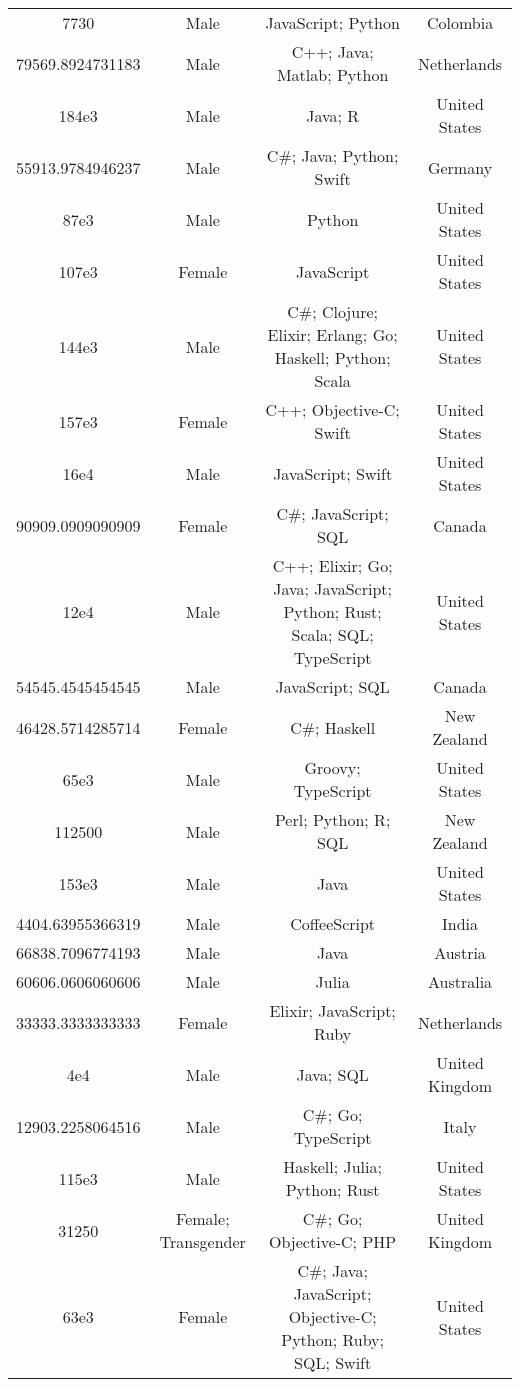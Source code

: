 \begin{center}
\begin{tabular}{ |c|c|c|c| }
7730  &  Male  &  JavaScript; Python  &  Colombia  \\ 
79569.8924731183  &  Male  &  C++; Java; Matlab; Python  &  Netherlands  \\ 
184e3  &  Male  &  Java; R  &  United States  \\ 
55913.9784946237  &  Male  &  C\#; Java; Python; Swift  &  Germany  \\ 
87e3  &  Male  &  Python  &  United States  \\ 
107e3  &  Female  &  JavaScript  &  United States  \\ 
144e3  &  Male  &  C\#; Clojure; Elixir; Erlang; Go; Haskell; Python; Scala  &  United States  \\ 
157e3  &  Female  &  C++; Objective-C; Swift  &  United States  \\ 
16e4  &  Male  &  JavaScript; Swift  &  United States  \\ 
90909.0909090909  &  Female  &  C\#; JavaScript; SQL  &  Canada  \\ 
12e4  &  Male  &  C++; Elixir; Go; Java; JavaScript; Python; Rust; Scala; SQL; TypeScript  &  United States  \\ 
54545.4545454545  &  Male  &  JavaScript; SQL  &  Canada  \\ 
46428.5714285714  &  Female  &  C\#; Haskell  &  New Zealand  \\ 
65e3  &  Male  &  Groovy; TypeScript  &  United States  \\ 
112500  &  Male  &  Perl; Python; R; SQL  &  New Zealand  \\ 
153e3  &  Male  &  Java  &  United States  \\ 
4404.63955366319  &  Male  &  CoffeeScript  &  India  \\ 
66838.7096774193  &  Male  &  Java  &  Austria  \\ 
60606.0606060606  &  Male  &  Julia  &  Australia  \\ 
33333.3333333333  &  Female  &  Elixir; JavaScript; Ruby  &  Netherlands  \\ 
4e4  &  Male  &  Java; SQL  &  United Kingdom  \\ 
12903.2258064516  &  Male  &  C\#; Go; TypeScript  &  Italy  \\ 
115e3  &  Male  &  Haskell; Julia; Python; Rust  &  United States  \\ 
31250  &  Female; Transgender  &  C\#; Go; Objective-C; PHP  &  United Kingdom  \\ 
63e3  &  Female  &  C\#; Java; JavaScript; Objective-C; Python; Ruby; SQL; Swift  &  United States  \\ 

\end{tabular}
\end{center}
